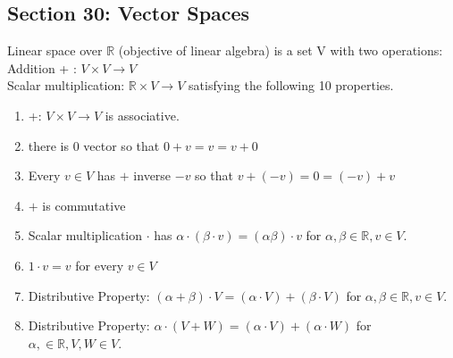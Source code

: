 \documentclass{article}
\newcommand\R{\ensuremath{\mathbb{R}}}
\begin{document}
\subsection{Section 30: Vector Spaces}
\begin{Def}
    Linear space over $\R$ (objective of linear algebra) is a set V with two operations: 
    \\Addition + : $V \times V \rightarrow V$
    \\Scalar multiplication: $\R \times V \rightarrow V$ satisfying the following 10 properties.
    \begin{enumerate}
        \item +: $V \times V \rightarrow V$ is associative.
        \item there is 0 vector so that $0+v=v=v+0$
        \item Every $v \in V$ has $+$ inverse $-v$ so that $v+(-v) = 0 = (-v)+v$
        \item $+$ is commutative
        \item Scalar multiplication $\cdot$ has $\alpha \cdot (\beta \cdot v) = (\alpha\beta) \cdot v$ for $\alpha, \beta \in \R, v\in V$.
        \item $1 \cdot v = v$ for every $v \in V$
        \item Distributive Property:
        $(\alpha + \beta) \cdot V = (\alpha \cdot V) + (\beta \cdot V)$ for $\alpha, \beta \in \R, v\in V$.
        \item Distributive Property: 
        $\alpha \cdot (V+W) = (\alpha \cdot V) + (\alpha \cdot W)$ for $\alpha,  \in \R, V, W\in V$.
    \end{enumerate}
\end{Def}
\end{document}
